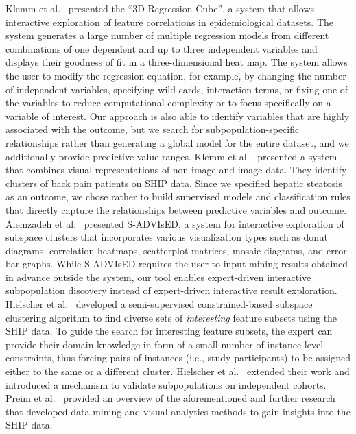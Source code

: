 \documentclass[
  oneside]{book}
\begin{document}
Klemm et al.~\autocite{Klemm:RegressionHeatmap2015} presented the ``3D Regression Cube'', a system that allows interactive exploration of feature correlations in epidemiological datasets.
The system generates a large number of multiple regression models from different combinations of one dependent and up to three independent variables and displays their goodness of fit in a three-dimensional heat map.
The system allows the user to modify the regression equation, for example, by changing the number of independent variables, specifying wild cards, interaction terms, or fixing one of the variables to reduce computational complexity or to focus specifically on a variable of interest.
Our approach is also able to identify variables that are highly associated with the outcome, but we search for subpopulation-specific relationships rather than generating a global model for the entire dataset, and we additionally provide predictive value ranges.
Klemm et al.~\autocite{Klemm14} presented a system that combines visual representations of non-image and image data.
They identify clusters of back pain patients on SHIP data.
Since we specified hepatic steatosis as an outcome, we chose rather to build supervised models and classification rules that directly capture the relationships between predictive variables and outcome.
Alemzadeh et al.~\autocite{eurova.20171118} presented S-ADVIsED, a system for interactive exploration of subspace clusters that incorporates various visualization types such as donut diagrams, correlation heatmaps, scatterplot matrices, mosaic diagrams, and error bar graphs.
While S-ADVIsED requires the user to input mining results obtained in advance outside the system, our tool enables expert-driven interactive subpopulation discovery instead of expert-driven interactive result exploration.
Hielscher et al.~\autocite{Hielscher16} developed a semi-supervised constrained-based subspace clustering algorithm to find diverse sets of \emph{interesting} feature subsets using the SHIP data.
To guide the search for interesting feature subsets, the expert can provide their domain knowledge in form of a small number of instance-level constraints, thus forcing pairs of instances (i.e., study participants) to be assigned either to the same or a different cluster.
Hielscher et al.~\autocite{Hielscher2018} extended their work and introduced a mechanism to validate subpopulations on independent cohorts.
Preim et al.~\autocite{Preim:EurographicsMedPrice2019} provided an overview of the aforementioned and further research that developed data mining and visual analytics methods to gain insights into the SHIP data.
\end{document}
